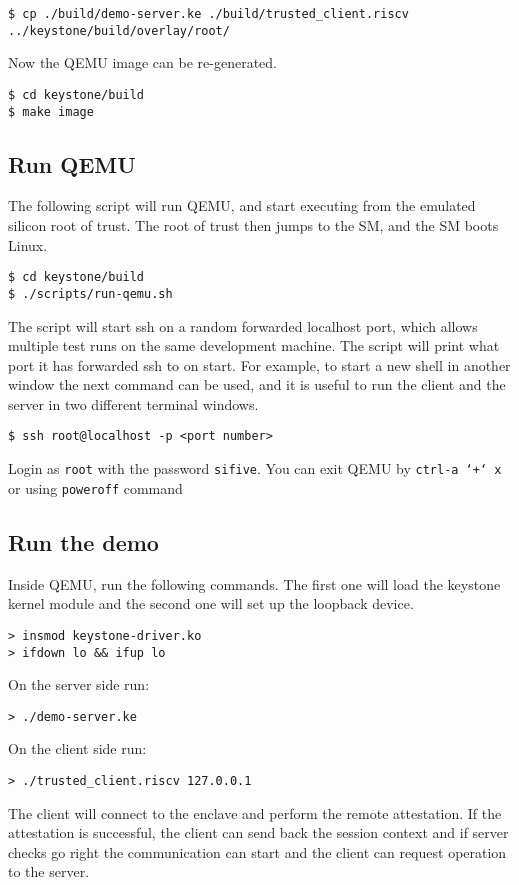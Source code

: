 \begin{lstlisting}[frame=single]
$ cp ./build/demo-server.ke ./build/trusted_client.riscv ../keystone/build/overlay/root/
\end{lstlisting}
Now the QEMU image can be re-generated.

\begin{lstlisting}[frame=single]
$ cd keystone/build
$ make image
\end{lstlisting}

\subsection{Run QEMU}
The following script will run QEMU, and start executing from the emulated silicon root of trust. The root of trust then jumps to the SM, and the SM boots Linux. 
\begin{lstlisting}[frame=single]
$ cd keystone/build
$ ./scripts/run-qemu.sh
\end{lstlisting}
The script will start ssh on a random forwarded localhost port, which allows multiple test runs on the same development machine. The script will print what port it has forwarded ssh to on start. For example, to start a new shell in another window the next command can be used, and it is useful to run the client and the server in two different terminal windows. 
\begin{lstlisting}[frame=single]
$ ssh root@localhost -p <port number>
\end{lstlisting}
Login as \texttt{\color{RedOrange}root} with the password \texttt{\color{RedOrange}sifive}. You can exit QEMU by \texttt{\color{RedOrange}ctrl-a\ `+`\ x} or using  \texttt{\color{RedOrange}poweroff}  command

\subsection{Run the demo}
Inside QEMU, run the following commands. The first one will load the keystone kernel module and the second one will set up the loopback device. 
\begin{lstlisting}[frame=single]
> insmod keystone-driver.ko 
> ifdown lo && ifup lo           
\end{lstlisting}
On the server side run: 
\begin{lstlisting}[frame=single]
> ./demo-server.ke         
\end{lstlisting}
On the client side run:
\begin{lstlisting}[frame=single]
> ./trusted_client.riscv 127.0.0.1        
\end{lstlisting}
The client will connect to the enclave and perform the remote attestation. If the attestation is successful, the client can send back the session context and if server checks go right the communication can start and the client can request operation to the server. 

